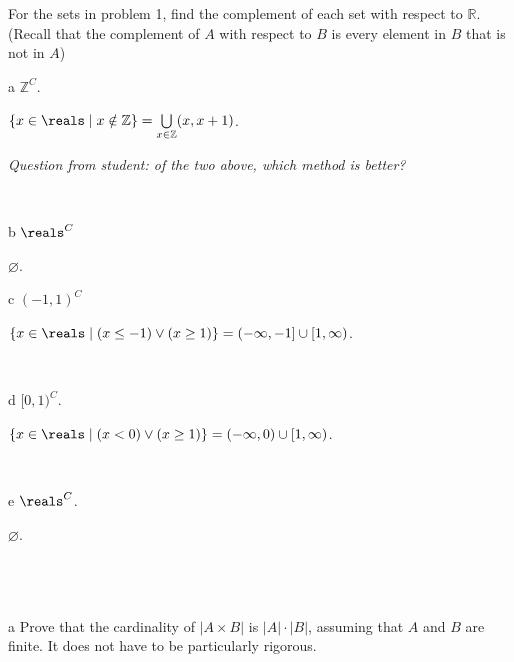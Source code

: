 \documentclass{article}
\begin{document}
\section{} 

\begin{problem*}
For the sets in problem 1, find the complement of each set with respect to $\mathbb{R}$. (Recall that the complement of $A$ with respect to $B$ is every element in $B$ that is not in $A$)
\end{problem*}

\begin{problem} a
$\mathbb{Z}^C$.
\end{problem}

$\{ x \in \reals \mid x \notin \mathbb{Z} \} = \bigcup \limits_{x \in \mathbb{Z}} (x, x+1)$.

\textit{Question from student: of the two above, which method is better?}

\

\begin{problem} b
$\reals ^C$
\end{problem}

$\varnothing$.

\begin{problem} c
$(-1,1)^C$
\end{problem}

$\{ x \in \reals \mid (x \leq -1) \lor (x \geq 1) \} = (-\infty, -1] \cup [1, \infty)$.

\

\begin{problem} d
$[0,1)^C$.
\end{problem}

$\{ x \in \reals \mid (x < 0) \lor (x \geq 1) \} = (-\infty, 0) \cup [1, \infty)$.

\

\begin{problem} e
$\reals ^C$.
\end{problem}

$\varnothing$.

\
\hline
\section{}

\begin{problem} a
Prove that the cardinality of $|A \times B|$ is $|A| \cdot |B|$, assuming that $A$ and $B$ are finite. It does not have to be particularly rigorous.
\end{problem}
\end{document}
